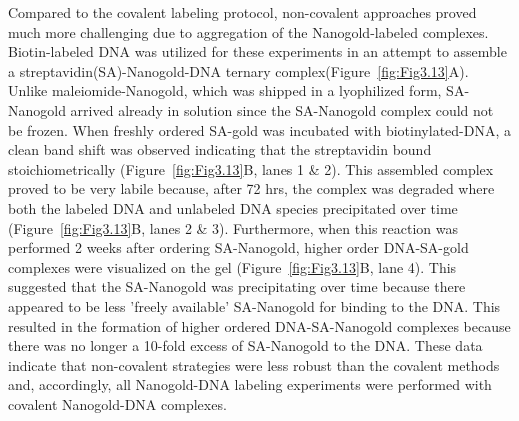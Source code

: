 \indent Compared to the covalent labeling protocol, non-covalent approaches proved much more challenging due to aggregation of the Nanogold-labeled complexes. Biotin-labeled DNA was utilized for these experiments in an attempt to assemble a streptavidin(SA)-Nanogold-DNA ternary complex(Figure~\ref{fig:Fig3.13}A). Unlike maleiomide-Nanogold, which was shipped in a lyophilized form, SA-Nanogold arrived already in solution since the SA-Nanogold complex could not be frozen.  When freshly ordered SA-gold was incubated with biotinylated-DNA, a clean band shift was observed indicating that the streptavidin bound stoichiometrically (Figure~\ref{fig:Fig3.13}B, lanes 1 \& 2).  This assembled complex proved to be very labile because, after 72 hrs, the complex was degraded where both the labeled DNA and unlabeled DNA species precipitated over time (Figure~\ref{fig:Fig3.13}B, lanes 2 \& 3). Furthermore, when this reaction was performed 2 weeks after ordering SA-Nanogold, higher order DNA-SA-gold complexes were visualized on the gel (Figure~\ref{fig:Fig3.13}B, lane 4). This suggested that the SA-Nanogold was precipitating over time because there appeared to be less 'freely available' SA-Nanogold for binding to the DNA. This resulted in the formation of higher ordered DNA-SA-Nanogold complexes because there was no longer a 10-fold excess of SA-Nanogold to the DNA. These data indicate that non-covalent strategies were less robust than the covalent methods and, accordingly, all Nanogold-DNA labeling experiments were performed with covalent Nanogold-DNA complexes.\\

